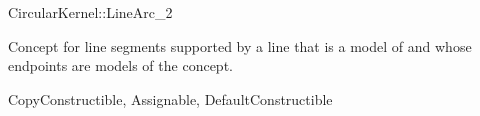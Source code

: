 \begin{ccRefConcept}{CircularKernel::LineArc_2}

\ccDefinition

Concept for line segments supported by a line that is a model of
 and whose endpoints are models of the
 concept. 

\ccRefines
CopyConstructible, Assignable, DefaultConstructible

\ccHasModels
{}

\end{ccRefConcept}
